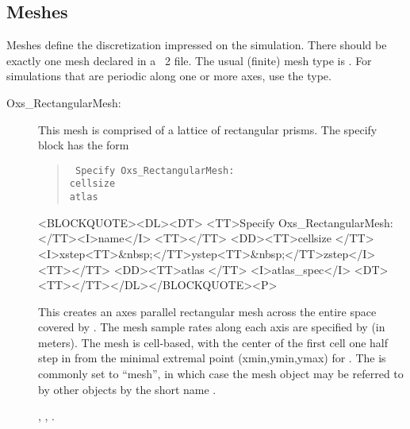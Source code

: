 \subsection{Meshes}\label{sec:Meshes}
Meshes define the discretization impressed on the simulation.  There
should be exactly one mesh declared in a \MIF~2 file.  The usual
(finite) mesh type is .  For simulations that
are periodic along one or more axes, use the
 type.

\begin{description}
\item[Oxs\_RectangularMesh:]
\label{HTMLoxsrectangularmesh}%
%
This mesh is comprised of a lattice of rectangular prisms.
The specify block has the form
\begin{latexonly}
\begin{quote}\tt
Specify Oxs\_RectangularMesh: \ocb \\
\bi cellsize \ocb{}\ccb\\
\bi atlas \\
\ccb
\end{quote}
\end{latexonly}
\begin{rawhtml}
<BLOCKQUOTE><DL><DT>
<TT>Specify Oxs_RectangularMesh:</TT><I>name</I> <TT>{</TT>
<DD><TT>cellsize {</TT>
  <I>xstep<TT>&nbsp;</TT>ystep<TT>&nbsp;</TT>zstep</I>
  <TT>}</TT>
<DD><TT>atlas </TT> <I>atlas_spec</I>
<DT><TT>}</TT></DL></BLOCKQUOTE><P>
\end{rawhtml}
This creates an axes parallel rectangular mesh across the entire space
covered by .  The mesh sample rates along each axis are
specified by  (in meters).  The mesh is
cell-based, with the center of the first cell one half step in from the
minimal extremal point (xmin,ymin,ymax) for .
The  is commonly set to ``mesh'', in which case the mesh
object may be referred to by other  objects by the short
name .

\begin{ExampleMifs}
 , , .
\end{ExampleMifs}


\end{description}
